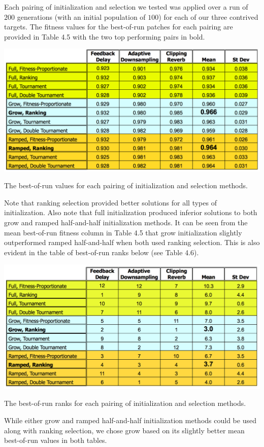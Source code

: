 \documentclass[a4paper,12pt]{report} 	%
\numberwithin{figure}{chapter}
\numberwithin{table}{chapter}
\numberwithin{equation}{chapter}
\begin{document}
\begin{flushleft}
Each pairing of initialization and selection we tested was applied over a run of $200$ generations (with an initial population of $100$) for each of our three contrived targets. The fitness values for the best-of-run patches for each pairing are provided in Table 4.5 with the two top performing pairs in bold.
\begin{table}[h!]
\begin{center}
\includegraphics[scale=0.6,width=\linewidth]{InitializationTable1}
\caption[Initialization and Selection Best-of-Run Values]{The best-of-run values for each pairing of initialization and selection methods.}
\end{center}
\end{table}
Note that ranking selection provided better solutions for all types of initialization. Also note that full initialization produced inferior solutions to both grow and ramped half-and-half initialization methods. It can be seen from the mean best-of-run fitness column in Table 4.5 that grow initialization slightly outperformed ramped half-and-half when both used ranking selection. This is also evident in the table of best-of-run ranks below (see Table 4.6).
\begin{table}[h!]
\begin{center}
\includegraphics[scale=0.6,width=\linewidth]{InitializationTable2}
\caption[Initialization and Selection Best-of-Run Ranks]{The best-of-run ranks for each pairing of initialization and selection methods.}
\end{center}
\end{table}
While either grow and ramped half-and-half initialization methods could be used along with ranking selection, we chose grow based on its slightly better mean best-of-run values in both tables.


\end{flushleft}
\end{document}

